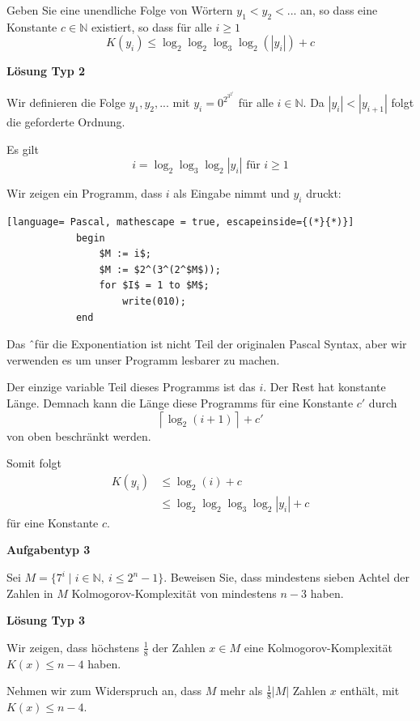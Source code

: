 \documentclass[a4paper, 11pt]{article}
\def\N{\mathbb{N}}
\begin{document}
        Geben Sie eine unendliche Folge von Wörtern $y_1 < y_2 < ...$ an, so dass eine Konstante $c \in \N$ existiert, so dass für alle $i \geq 1$ 
        $$K(y_i) \leq \log_2\log_2\log_3\log_2(|y_i|) + c$$

        \textbf{Lösung Typ 2}
        
        Wir definieren die Folge $y_1,y_2,...$ mit $y_i = 0^{2^{3^{2^i}}}$ für alle $i \in \N$. Da $|y_i| < |y_{i+1}|$ folgt die geforderte Ordnung.
    
        Es gilt
        $$i = \log_2\log_3\log_2|y_i|  \text{ für } i \geq 1$$
    
        Wir zeigen ein Programm, dass $i$ als Eingabe nimmt und $y_i$ druckt:
    
        \begin{lstlisting}[language= Pascal, mathescape = true, escapeinside={(*}{*)}]
            begin
                $M := i$;
                $M := $2^(3^(2^$M$));
                for $I$ = 1 to $M$;
                    write(010);
            end
        \end{lstlisting}
        Das \^ \ für die Exponentiation ist nicht Teil der originalen Pascal Syntax, aber wir verwenden es um unser Programm lesbarer zu machen.
    
        Der einzige variable Teil dieses Programms ist das $i$. Der Rest hat konstante Länge. Demnach kann die Länge diese Programms für eine Konstante $c'$ durch 
        $$\left\lceil\log_2(i+1)\right\rceil + c'$$
        von oben beschränkt werden.
    
        Somit folgt
        \begin{align*}
            K(y_i) &\leq \log_2(i) + c\\
            &\leq \log_2\log_2\log_3\log_2|y_i| + c
        \end{align*}
        für eine Konstante $c$. 
    
    \vspace*{1cm}
    
        \textbf{Aufgabentyp 3}

        Sei $M = \{7^i \mid i \in \N, \ i \leq 2^n-1\}$. Beweisen Sie, dass mindestens sieben Achtel der Zahlen in $M$ Kolmogorov-Komplexität von mindestens $n-3$ haben.
    
        \textbf{Lösung Typ 3}

        Wir zeigen, dass höchstens $\frac{1}{8}$ der Zahlen $x \in M$ eine Kolmogorov-Komplexität $K(x) \leq n-4$ haben. 
    
        Nehmen wir zum Widerspruch an, dass $M$ mehr als $\frac{1}{8}|M|$ Zahlen $x$ enthält, mit $K(x) \leq n-4$. 
    
\end{document}

